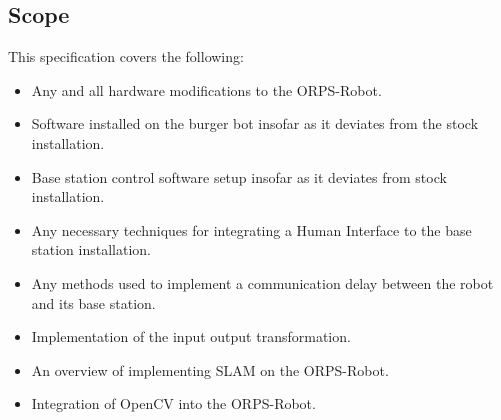 \documentclass[english,12pt]{article}
\begin{document}
\subsection{Scope}
This specification covers the following:\\
\begin{itemize}
    \item Any and all hardware modifications to the ORPS-Robot.
    \item Software installed on the burger bot insofar as it deviates
    from the stock installation.
    \item Base station control software setup insofar as it deviates
    from stock installation.
    \item Any necessary techniques for integrating a Human
    Interface to the base station installation.
    \item Any methods used to implement a communication delay
    between the robot and its base station.
    \item Implementation of the input output transformation.
    \item An overview of implementing SLAM on the ORPS-Robot.
    \item Integration of OpenCV into the ORPS-Robot.
\end{itemize}
\end{document}
